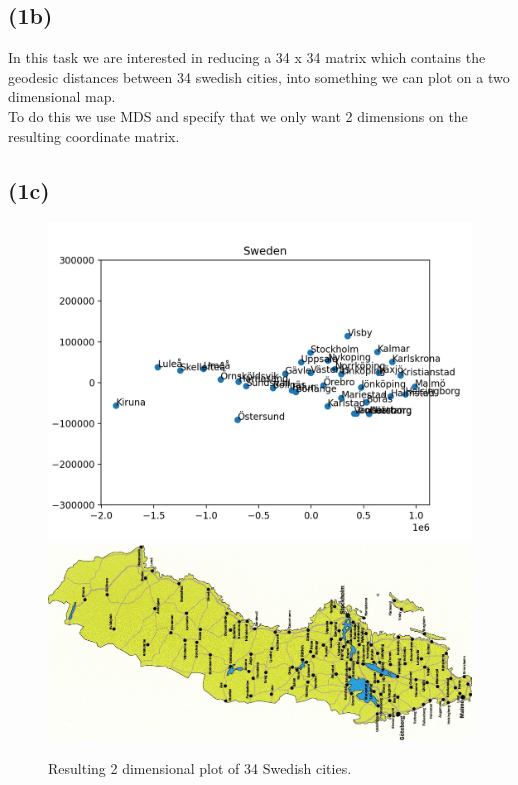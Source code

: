 \documentclass[12pt, letterpaper]{article}
\begin{document}
    \subsection*{(1b)}
      In this task we are interested in reducing a 34 x 34 matrix which contains the geodesic distances between 34 swedish cities, into something we can plot on a two dimensional map.\\
      To do this we use MDS and specify that we only want 2 dimensions on the resulting coordinate matrix.\\
    \subsection*{(1c)}
      \begin{figure}[H]
        \caption{Resulting 2 dimensional plot of 34 Swedish cities.}
        \centering
        \includegraphics[scale=0.7]{Swedishcities}
        \includegraphics[scale=0.1]{Swedishmap}
      \end{figure}\\
\end{document}
